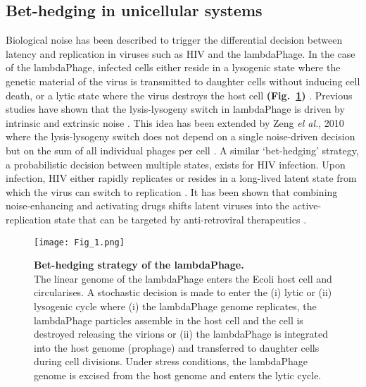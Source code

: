 \subsection{Bet-hedging in unicellular systems}

Biological noise has been described to trigger the differential decision between latency and replication in viruses such as \Gls{HIV} and the \gls{lambdaPhage}. In the case of the \gls{lambdaPhage}, infected cells either reside in a lysogenic state where the genetic material of the virus is transmitted to daughter cells without inducing cell death, or a lytic state where the virus destroys the host cell \textbf{(Fig.~\ref{fig0:bedhedging})} \citep{Lieb1953}. Previous studies have shown that the lysis-lysogeny switch in \gls{lambdaPhage} is driven by intrinsic and extrinsic noise \citep{Arkin1998, St-Pierre2008}. This idea has been extended by Zeng \textit{el al.}, 2010 where the lysis-lysogeny switch does not depend on a single noise-driven decision but on the sum of all individual phages per cell \citep{Zeng2010}. A similar ‘bet-hedging’ strategy, a probabilistic decision between multiple states, exists for \Gls{HIV} infection. Upon infection, \Gls{HIV} either rapidly replicates or resides in a long-lived latent state from which the virus can switch to replication \citep{Weinberger2015}. It has been shown that combining noise-enhancing and activating drugs shifts latent viruses into the active-replication state that can be targeted by anti-retroviral therapeutics \citep{Dar2014}. 

\begin{figure}[!h]
\centering
\texttt{[image: Fig\_1.png]}
\caption[Bet-hedging strategy of the \gls{lambdaPhage}]{\textbf{Bet-hedging strategy of the \gls{lambdaPhage}.}\\
The linear genome of the \gls{lambdaPhage} enters the \Gls{Ecoli} host cell and circularises. A stochastic decision is made to enter the (i) lytic or (ii) lysogenic cycle where (i) the \gls{lambdaPhage} genome replicates, the \gls{lambdaPhage} particles assemble in the host cell and the cell is destroyed releasing the virions or (ii) the \gls{lambdaPhage} is integrated into the host genome (prophage) and transferred to daughter cells during cell divisions. Under stress conditions, the \gls{lambdaPhage} genome is excised from the host genome and enters the lytic cycle.}
\label{fig0:bedhedging}
\end{figure}

